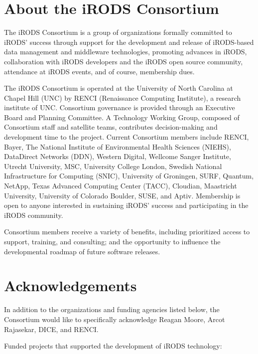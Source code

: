 \documentclass[10pt,oneside]{memoir}
\begin{document}
\section{About the iRODS Consortium}

The iRODS Consortium is a group of organizations formally committed to iRODS' success through support for the development and release of iRODS-based data management and middleware technologies, promoting advances in iRODS, collaboration with iRODS developers and the iRODS open source community, attendance at iRODS events, and of course, membership dues.

The iRODS Consortium is operated at the University of North Carolina at Chapel Hill (UNC) by RENCI (Renaissance Computing Institute), a research institute of UNC. Consortium governance is provided through an Executive Board and Planning Committee. A Technology Working Group, composed of Consortium staff and satellite teams, contributes decision-making and development time to the project. Current Consortium members include RENCI, Bayer, The National Institute of Environmental Health Sciences (NIEHS), DataDirect Networks (DDN), Western Digital, Wellcome Sanger Institute, Utrecht University, MSC, University College London, Swedish National Infrastructure for Computing (SNIC), University of Groningen, SURF, Quantum, NetApp, Texas Advanced Computing Center (TACC), Cloudian, Maastricht University, University of Colorado Boulder, SUSE, and Aptiv. Membership is open to anyone interested in sustaining iRODS' success and participating in the iRODS community.

Consortium members receive a variety of benefits, including prioritized access to support, training, and consulting; and the opportunity to influence the developmental roadmap of future software releases.


\newpage
\section{Acknowledgements}

In addition to the organizations and funding agencies listed below, the Consortium would like to specifically acknowledge Reagan Moore, Arcot Rajasekar, DICE, and RENCI.

Funded projects that supported the development of iRODS technology:
\end{document}
